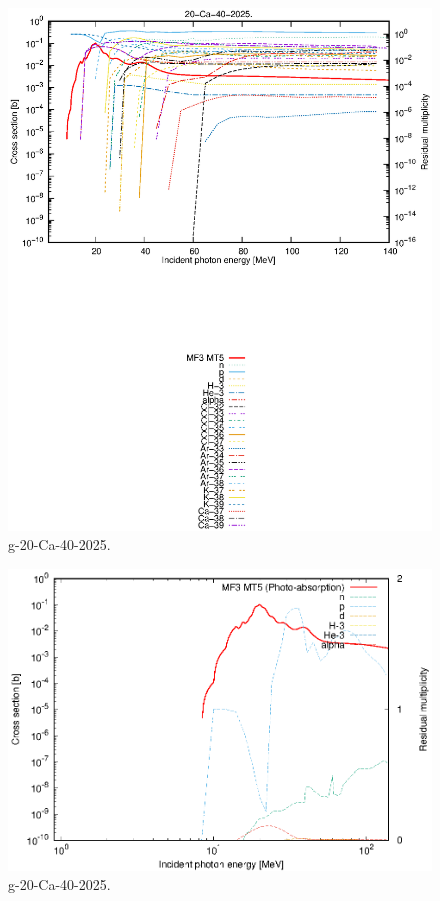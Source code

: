 \begin{figure}
 \includegraphics[width=\linewidth]{eps/g_20-Ca-40_2025.eps}
  \caption{g-20-Ca-40-2025.}
\end{figure}
\newpage \clearpage

\begin{figure}
 \includegraphics[width=\linewidth]{eps-log/g_20-Ca-40_2025.eps}
 \caption{g-20-Ca-40-2025.}
\end{figure}
\newpage \clearpage

